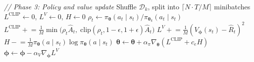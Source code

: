\documentclass[11pt]{article}
\begin{document}
\begin{algorithm}[p]
\begin{minipage}[t]{0.68\linewidth}
\begin{algorithmic}[1]
    \EndFor
    \Statex \hspace{\algorithmicindent}\textit{// Phase 3: Policy and value update}
    \State Shuffle $\mathcal{D}_k$, split into $\lceil N \!\cdot\! T / M \rceil$ minibatches
            \State $L^{\text{CLIP}} \!\gets\! 0$, \; $L^{V} \!\gets\! 0$, \; $H \!\gets\! 0$
                \State $\rho_t \gets \pi_{\boldsymbol{\theta}}(a_t \mid s_t) / \pi_{\boldsymbol{\theta}_k}(a_t \mid s_t)$
                \State $L^{\text{CLIP}} \mathrel{+}= \frac{1}{M} \min\!\big(\rho_t \hat{A}_t,\; \text{clip}(\rho_t, 1{-}\epsilon, 1{+}\epsilon) \hat{A}_t\big)$
                \State $L^{V} \mathrel{+}= \frac{1}{M} (V_{\boldsymbol{\phi}}(s_t) - \hat{R}_t)^2$
                    \State $H \mathrel{-}= \frac{1}{M} \pi_{\boldsymbol{\theta}}(a \mid s_t) \log \pi_{\boldsymbol{\theta}}(a \mid s_t)$
                \EndFor
            \EndFor
            \State $\boldsymbol{\theta} \gets \boldsymbol{\theta} + \alpha_\pi \nabla_{\boldsymbol{\theta}} (L^{\text{CLIP}} + c_e H)$
            \State $\boldsymbol{\phi} \gets \boldsymbol{\phi} - \alpha_V \nabla_{\boldsymbol{\phi}} L^{V}$
        \EndFor
    \EndFor
\EndFor
\end{algorithmic}
\end{minipage}
\end{algorithm}
\end{document}
